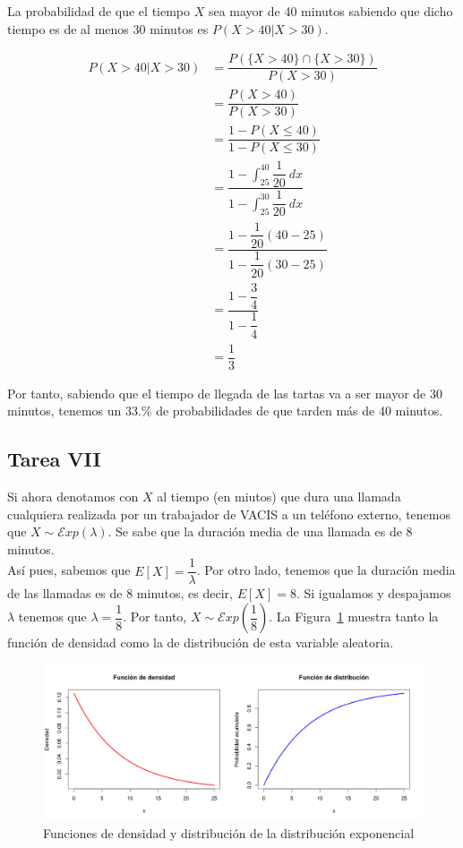 \documentclass[12pt,a4paper,twoside,openright,titlepage,final]{article}
\begin{document}
La probabilidad de que el tiempo $X$ sea mayor de 40 minutos sabiendo que dicho tiempo es de al menos 30 minutos es $P(X > 40 | X > 30)$.

\begin{align*}
\displaystyle P(X > 40 | X > 30) & = \dfrac{P(\{X > 40\}\cap \{X > 30\})}{P(X > 30)} \\
& = \dfrac{P(X > 40)}{P(X > 30)} \\ & = \dfrac{1 - P(X \leq 40)}{1 - P(X \leq 30)} \\
& = \dfrac{1 - \int_{25}^{40} \dfrac{1}{20} \ dx}{1 - \int_{25}^{30} \dfrac{1}{20} \ dx} \\
& = \dfrac{1 - \dfrac{1}{20}(40-25)}{1 - \dfrac{1}{20}(30-25)} \\
& = \dfrac{1- \dfrac{3}{4}}{1 - \dfrac{1}{4}} \\
& = \dfrac{1}{3}
\end{align*}

Por tanto, sabiendo que el tiempo de llegada de las tartas va a ser mayor de 30 minutos, tenemos un 33.\% de probabilidades de que tarden más de 40 minutos.

\subsection{Tarea VII}

Si ahora denotamos con $X$ al tiempo (en miutos) que dura una llamada cualquiera realizada por un trabajador de VACIS a un teléfono externo, tenemos que $X \sim \mathcal{E}xp(\lambda)$. Se sabe que la duración media de una llamada es de 8 minutos.\\

Así pues, sabemos que $E[X] = \dfrac{1}{\lambda}$. Por otro lado, tenemos que la duración media de las llamadas es de 8 minutos, es decir, $E[X] = 8$. Si igualamos y despajamos $\lambda$ tenemos que $\lambda = \dfrac{1}{8}$. Por tanto, $X \sim \mathcal{E}xp(\dfrac{1}{8})$. La Figura~\ref{fig:funcion_distribucion_exponencial} muestra tanto la función de densidad como la de distribución de esta variable aleatoria.\\

\begin{figure}[tbph!]
\centering
\includegraphics[width=0.9\linewidth]{imagenes/funcion_distribucion_exponencial}
\caption{Funciones de densidad y distribución de la distribución exponencial}
\label{fig:funcion_distribucion_exponencial}
\end{figure}
\end{document}
